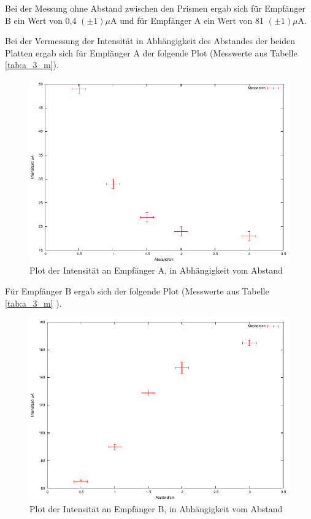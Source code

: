 \documentclass[12pt]{scrartcl}
\begin{document}
Bei der Messung ohne Abstand zwischen den Prismen ergab sich für Empfänger B ein Wert von 0,4 $(\pm 1) \mu$A und für Empfänger A ein Wert von 81 $(\pm 1) \mu$A.

Bei der Vermessung der Intensität in Abhängigkeit des Abstandes der beiden Platten ergab sich für Empfänger A der folgende Plot (Messwerte aus Tabelle \ref{tab:a_3_m}).

\begin{figure}[H]
\centering
    \includegraphics[scale = 1]{a_3_A.pdf}
  	\caption[Plot der Intensität an Empfänger A, in Abhängigkeit vom Abstand]{Plot der Intensität an Empfänger A, in Abhängigkeit vom Abstand}
  \label{fig:a_3_A}
\end{figure}

Für Empfänger B ergab sich der folgende Plot (Messwerte aus Tabelle \ref{tab:a_3_m} ).

\begin{figure}[H]
\centering
    \includegraphics[scale = 1]{a_3_B.pdf}
  	\caption[Plot der Intensität an Empfänger B, in Abhängigkeit vom Abstand]{Plot der Intensität an Empfänger B, in Abhängigkeit vom Abstand}
  \label{fig:a_3_B}
\end{figure}
\end{document}

